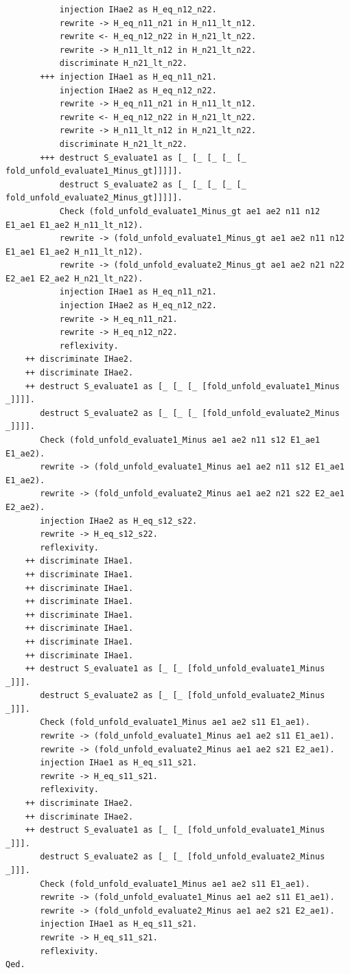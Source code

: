 \documentclass{article}
\begin{document}
\begin{lstlisting}
           injection IHae2 as H_eq_n12_n22.
           rewrite -> H_eq_n11_n21 in H_n11_lt_n12.
           rewrite <- H_eq_n12_n22 in H_n21_lt_n22.
           rewrite -> H_n11_lt_n12 in H_n21_lt_n22.
           discriminate H_n21_lt_n22.
       +++ injection IHae1 as H_eq_n11_n21.
           injection IHae2 as H_eq_n12_n22.
           rewrite -> H_eq_n11_n21 in H_n11_lt_n12.
           rewrite <- H_eq_n12_n22 in H_n21_lt_n22.
           rewrite -> H_n11_lt_n12 in H_n21_lt_n22.
           discriminate H_n21_lt_n22.
       +++ destruct S_evaluate1 as [_ [_ [_ [_ [_ fold_unfold_evaluate1_Minus_gt]]]]].
           destruct S_evaluate2 as [_ [_ [_ [_ [_ fold_unfold_evaluate2_Minus_gt]]]]].
           Check (fold_unfold_evaluate1_Minus_gt ae1 ae2 n11 n12 E1_ae1 E1_ae2 H_n11_lt_n12).
           rewrite -> (fold_unfold_evaluate1_Minus_gt ae1 ae2 n11 n12 E1_ae1 E1_ae2 H_n11_lt_n12).
           rewrite -> (fold_unfold_evaluate2_Minus_gt ae1 ae2 n21 n22 E2_ae1 E2_ae2 H_n21_lt_n22).
           injection IHae1 as H_eq_n11_n21.
           injection IHae2 as H_eq_n12_n22.
           rewrite -> H_eq_n11_n21.
           rewrite -> H_eq_n12_n22.
           reflexivity.
    ++ discriminate IHae2.
    ++ discriminate IHae2.
    ++ destruct S_evaluate1 as [_ [_ [_ [fold_unfold_evaluate1_Minus _]]]].
       destruct S_evaluate2 as [_ [_ [_ [fold_unfold_evaluate2_Minus _]]]].
       Check (fold_unfold_evaluate1_Minus ae1 ae2 n11 s12 E1_ae1 E1_ae2).
       rewrite -> (fold_unfold_evaluate1_Minus ae1 ae2 n11 s12 E1_ae1 E1_ae2).
       rewrite -> (fold_unfold_evaluate2_Minus ae1 ae2 n21 s22 E2_ae1 E2_ae2).
       injection IHae2 as H_eq_s12_s22.
       rewrite -> H_eq_s12_s22.
       reflexivity.
    ++ discriminate IHae1.
    ++ discriminate IHae1.
    ++ discriminate IHae1.
    ++ discriminate IHae1.
    ++ discriminate IHae1.
    ++ discriminate IHae1.
    ++ discriminate IHae1.
    ++ discriminate IHae1.
    ++ destruct S_evaluate1 as [_ [_ [fold_unfold_evaluate1_Minus _]]].
       destruct S_evaluate2 as [_ [_ [fold_unfold_evaluate2_Minus _]]].
       Check (fold_unfold_evaluate1_Minus ae1 ae2 s11 E1_ae1).
       rewrite -> (fold_unfold_evaluate1_Minus ae1 ae2 s11 E1_ae1).
       rewrite -> (fold_unfold_evaluate2_Minus ae1 ae2 s21 E2_ae1).
       injection IHae1 as H_eq_s11_s21.
       rewrite -> H_eq_s11_s21.
       reflexivity.
    ++ discriminate IHae2.
    ++ discriminate IHae2.
    ++ destruct S_evaluate1 as [_ [_ [fold_unfold_evaluate1_Minus _]]].
       destruct S_evaluate2 as [_ [_ [fold_unfold_evaluate2_Minus _]]].
       Check (fold_unfold_evaluate1_Minus ae1 ae2 s11 E1_ae1).
       rewrite -> (fold_unfold_evaluate1_Minus ae1 ae2 s11 E1_ae1).
       rewrite -> (fold_unfold_evaluate2_Minus ae1 ae2 s21 E2_ae1).
       injection IHae1 as H_eq_s11_s21.
       rewrite -> H_eq_s11_s21.
       reflexivity.
Qed.
\end{lstlisting}
\end{document}
